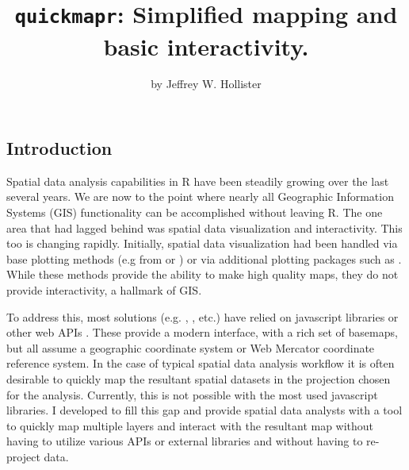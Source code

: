 \title{\texttt{quickmapr}: Simplified mapping and basic interactivity.}
\author{by Jeffrey W. Hollister}

\maketitle


\subsection{Introduction}\label{introduction}

Spatial data analysis capabilities in R have been steadily growing over
the last several years. We are now to the point where nearly all
Geographic Information Systems (GIS) functionality can be accomplished
without leaving R. The one area that had lagged behind was spatial data
visualization and interactivity. This too is changing rapidly.
Initially, spatial data visualization had been handled via base plotting
methods (e.g from  or ) or via additional
plotting packages such as
\citep{pebesma2005classes, bivand2013asdar, raster, ggplot2}.
While these methods provide the ability to make high quality maps, they
do not provide interactivity, a hallmark of GIS.

To address this, most solutions (e.g. ,
,  etc.) have relied on javascript
libraries or other web APIs \citep{ggmap, leaflet, mapview}. These
provide a modern interface, with a rich set of basemaps, but all assume
a geographic coordinate system or Web Mercator coordinate reference
system. In the case of typical spatial data analysis workflow it is
often desirable to quickly map the resultant spatial datasets in the
projection chosen for the analysis. Currently, this is not possible with
the most used javascript libraries. I developed  to
fill this gap and provide spatial data analysts with a tool to quickly
map multiple layers and interact with the resultant map without having
to utilize various APIs or external libraries and without having to
re-project data.

